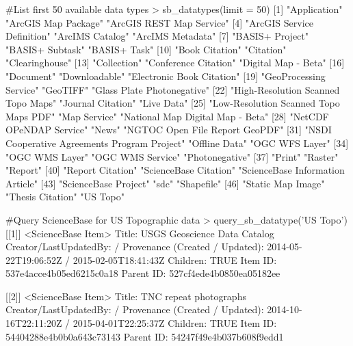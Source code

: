 \begin{example}
#List first 50 available data types
> sb_datatypes(limit = 50)
 [1] "Application"                                 "ArcGIS Map Package"                "ArcGIS REST Map Service"                    
 [4] "ArcGIS Service Definition"                   "ArcIMS Catalog"                    "ArcIMS Metadata"                            
 [7] "BASIS+ Project"                              "BASIS+ Subtask"                    "BASIS+ Task"                                
[10] "Book Citation"                               "Citation"                          "Clearinghouse"                              
[13] "Collection"                                  "Conference Citation"               "Digital Map - Beta"                         
[16] "Document"                                    "Downloadable"                      "Electronic Book Citation"                   
[19] "GeoProcessing Service"                       "GeoTIFF"                           "Glass Plate Photonegative"                  
[22] "High-Resolution Scanned Topo Maps"           "Journal Citation"                  "Live Data"                                  
[25] "Low-Resolution Scanned Topo Maps PDF"        "Map Service"                       "National Map Digital Map - Beta"            
[28] "NetCDF OPeNDAP Service"                      "News"                              "NGTOC Open File Report GeoPDF"              
[31] "NSDI Cooperative Agreements Program Project" "Offline Data"                      "OGC WFS Layer"                              
[34] "OGC WMS Layer"                               "OGC WMS Service"                   "Photonegative"                              
[37] "Print"                                       "Raster"                            "Report"                                     
[40] "Report Citation"                             "ScienceBase Citation"              "ScienceBase Information Article"            
[43] "ScienceBase Project"                         "sdc"                               "Shapefile"                                  
[46] "Static Map Image"                            "Thesis Citation"                   "US Topo"                                    

#Query ScienceBase for US Topographic data
> query_sb_datatype('US Topo')
[[1]]
<ScienceBase Item> 
  Title: USGS Geoscience Data Catalog
  Creator/LastUpdatedBy:      / 
  Provenance (Created / Updated):  2014-05-22T19:06:52Z / 2015-02-05T18:41:43Z
  Children: TRUE
  Item ID: 537e4acce4b05ed6215c0a18
  Parent ID: 527cf4ede4b0850ea05182ee

[[2]]
<ScienceBase Item> 
  Title: TNC repeat photographs
  Creator/LastUpdatedBy:      / 
  Provenance (Created / Updated):  2014-10-16T22:11:20Z / 2015-04-01T22:25:37Z
  Children: TRUE
  Item ID: 54404288e4b0b0a643c73143
  Parent ID: 54247f49e4b037b608f9edd1
\end{example}



